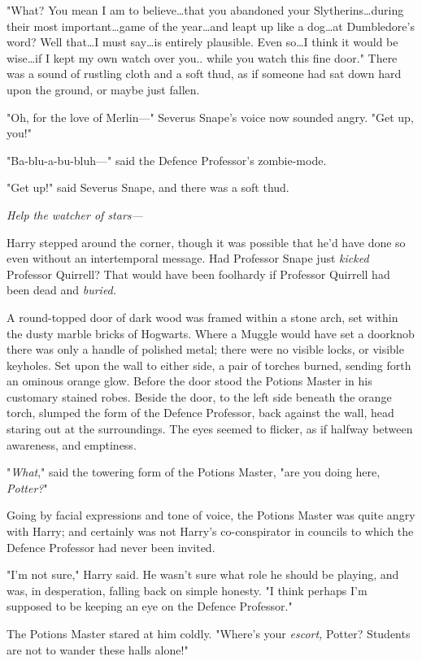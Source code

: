 "What? You mean I am to believe…that you abandoned your
Slytherins…during their most important…game of the year…and
leapt up like a dog…at Dumbledore's word? Well that…I must
say…is entirely plausible. Even so…I think it would be
wise…if I kept my own watch over you.. while you watch this fine door."
There was a sound of rustling cloth and a soft thud, as if someone had sat down
hard upon the ground, or maybe just fallen.

"Oh, for the love of Merlin—" Severus Snape's voice now sounded angry. "Get
up, you!"

"Ba-blu-a-bu-bluh—" said the Defence Professor's zombie-mode.

"Get up!" said Severus Snape, and there was a soft thud.

\emph{Help the watcher of stars—}

Harry stepped around the corner, though it was possible that he'd have done so
even without an intertemporal message. Had Professor Snape just \emph{kicked}
Professor Quirrell? That would have been foolhardy if Professor Quirrell had
been dead and \emph{buried.}

A round-topped door of dark wood was framed within a stone arch, set within the
dusty marble bricks of Hogwarts. Where a Muggle would have set a doorknob there
was only a handle of polished metal; there were no visible locks, or visible
keyholes. Set upon the wall to either side, a pair of torches burned, sending
forth an ominous orange glow. Before the door stood the Potions Master in his
customary stained robes. Beside the door, to the left side beneath the orange
torch, slumped the form of the Defence Professor, back against the wall, head
staring out at the surroundings. The eyes seemed to flicker, as if halfway
between awareness, and emptiness.

"\emph{What}," said the towering form of the Potions Master, "are you doing
here, \emph{Potter?}"

Going by facial expressions and tone of voice, the Potions Master was quite
angry with Harry; and certainly was not Harry's co-conspirator in councils to
which the Defence Professor had never been invited.

"I'm not sure," Harry said. He wasn't sure what role he should be playing, and
was, in desperation, falling back on simple honesty. "I think perhaps I'm
supposed to be keeping an eye on the Defence Professor."

The Potions Master stared at him coldly. "Where's your \emph{escort,} Potter?
Students are not to wander these halls alone!"

